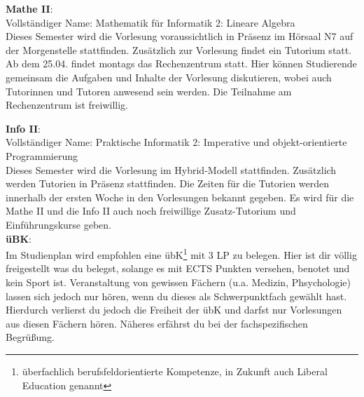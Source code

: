 \textbf{Mathe II}:\\
Vollständiger Name: Mathematik für Informatik 2: Lineare Algebra\\
Dieses Semester wird die Vorlesung voraussichtlich in Präsenz im Hörsaal N7 auf der Morgenstelle stattfinden.
Zusätzlich zur Vorlesung findet ein Tutorium statt. \\
Ab dem 25.04. findet montags das Rechenzentrum statt. Hier können Studierende gemeinsam die Aufgaben und Inhalte der Vorlesung diskutieren,
wobei auch Tutorinnen und Tutoren anwesend sein werden. Die Teilnahme am Rechenzentrum ist freiwillig.

\textbf{Info II}:\\
Vollständiger Name: Praktische Informatik 2: Imperative und objekt-orientierte Programmierung\\
Dieses Semester wird die Vorlesung im Hybrid-Modell stattfinden. Zusätzlich werden Tutorien in Präsenz stattfinden.
Die Zeiten für die Tutorien werden innerhalb der ersten Woche in den Vorlesungen bekannt gegeben.
Es wird für die Mathe II und die Info II auch noch freiwillige Zusatz-Tutorium und Einführungskurse geben.\\

\textbf{üBK}:\\
Im Studienplan wird empfohlen eine übK\footnote{überfachlich berufsfeldorientierte Kompetenze, in Zukunft auch Liberal Education genannt}
mit 3 LP zu belegen. Hier ist dir völlig freigestellt was du belegst, solange es mit ECTS Punkten versehen, benotet und kein Sport ist.
Veranstaltung von gewissen Fächern (u.a. Medizin, Phsychologie) lassen sich jedoch nur hören, wenn du dieses als Schwerpunktfach gewählt hast.
Hierdurch verlierst du jedoch die Freiheit der übK und darfst nur Vorlesungen aus diesen Fächern hören. Näheres erfährst du bei der fachspezifischen Begrüßung.

